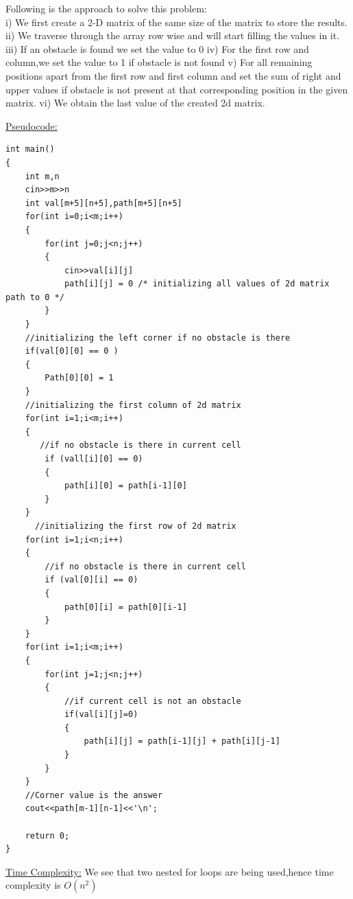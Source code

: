 \documentclass[12pt]{book}
\begin{document}
Following is the approach to solve this problem:\\
i) We first create a 2-D matrix of the same size of the matrix to store the results.\newline
ii) We traverse through the array row wise and will start filling the values in it.\newline
iii) If an obstacle is found we set the value to 0\newline
iv) For the first row and column,we set the value to 1 if obstacle is not found\newline
v) For all remaining positions apart from the first row and first column and set the sum of right and upper values if obstacle is not present at that corresponding position in the given matrix.\newline
vi) We obtain the last value of the created 2d matrix.\newline

\underline{Pseudocode:}\\

\begin{lstlisting}
int main()
{
    int m,n
    cin>>m>>n
    int val[m+5][n+5],path[m+5][n+5] 
    for(int i=0;i<m;i++)
    {
        for(int j=0;j<n;j++)
        {
            cin>>val[i][j]
            path[i][j] = 0 /* initializing all values of 2d matrix path to 0 */
        }
    }
	//initializing the left corner if no obstacle is there
    if(val[0][0] == 0 )
    {
        Path[0][0] = 1
    }
	//initializing the first column of 2d matrix
    for(int i=1;i<m;i++)
    {
	   //if no obstacle is there in current cell
        if (vall[i][0] == 0)
        {
            path[i][0] = path[i-1][0]
        }
    }
      //initializing the first row of 2d matrix
    for(int i=1;i<n;i++)
    {
        //if no obstacle is there in current cell
        if (val[0][i] == 0)
        {
            path[0][i] = path[0][i-1]
        }
    }
    for(int i=1;i<m;i++)
    {
        for(int j=1;j<n;j++)
        {
            //if current cell is not an obstacle
            if(val[i][j]=0)
            {
                path[i][j] = path[i-1][j] + path[i][j-1]
            }
        }
    }
    //Corner value is the answer
    cout<<path[m-1][n-1]<<'\n';
    
    return 0;
}
\end{lstlisting}

\underline{Time Complexity:}\newline
We see that two nested for loops are being used,hence time complexity is $O(n^2)$\\
\end{document}
